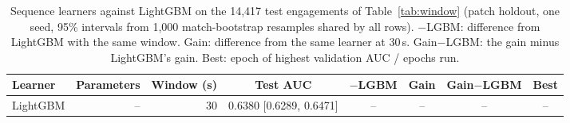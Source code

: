 \begin{table}[t]
\centering
\caption{Sequence learners against LightGBM on the 14,417 test engagements of Table~\ref{tab:window}
(patch holdout, one seed, 95\% intervals from 1,000 match-bootstrap resamples shared by all rows).
$-$LGBM: difference from LightGBM with the same window. Gain: difference from the same learner at
30\,s. Gain$-$LGBM: the gain minus LightGBM's gain. Best: epoch of highest validation AUC / epochs run.}
\label{tab:sequence}
\scriptsize
\setlength{\tabcolsep}{2.5pt}
\begin{tabular}{@{}lrrccccc@{}}
\toprule
Learner & Parameters & Window (s) & Test AUC & $-$LGBM & Gain & Gain$-$LGBM & Best \\
\midrule
LightGBM & -- & 30 & 0.6380 [0.6289, 0.6471] & -- & -- & -- & -- \\

\end{tabular}
\end{table}
